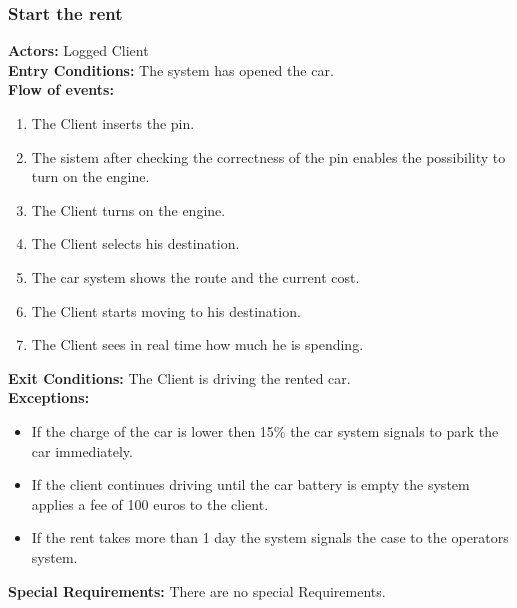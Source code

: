 \subsubsection{Start the rent}
%
\textbf{Actors:}
Logged Client \\
%
\textbf{Entry Conditions:}
The system has opened the car.\\
%
\textbf{Flow of events:}
\begin{enumerate}
\item The Client inserts the pin.
\item The sistem after checking the correctness of the pin enables the possibility to turn on the engine.
\item The Client turns on the engine.
\item The Client selects his destination.
\item The car system shows the route and the current cost.
\item The Client starts moving to his destination.
\item The Client sees in real time how much he is spending.
\end{enumerate}
\textbf{Exit Conditions:}
The Client is driving the rented car.\\
%
\textbf{Exceptions:}
\begin{itemize}
\item If the charge of the car is lower then 15\% the car system signals to park the car immediately.
\item If the client continues driving until the car battery is empty the system applies a fee of 100 euros to the client.
\item If the rent takes more than 1 day the system signals the case to the operators system.
\end{itemize}
%
\textbf{Special Requirements:}
There are no special Requirements.



